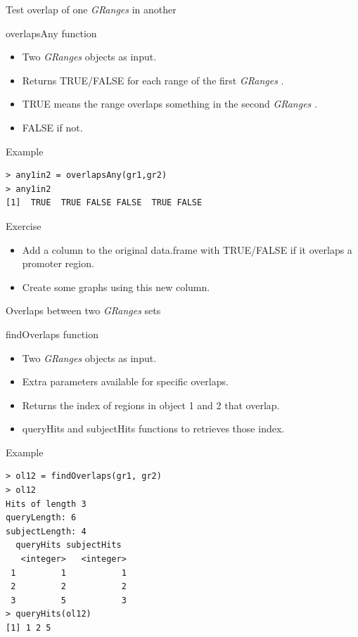 \documentclass[10pt]{beamer}
\newcommand{\gr}{{\it GRanges} }
\begin{document}
\begin{frame}[fragile, shrink=10]{Test overlap of one \gr in another}
  \begin{block}{{\sf overlapsAny} function}
    \begin{itemize}
    \item Two {\it GRanges} objects as input.
    \item Returns {\sf TRUE/FALSE} for each range of the first \gr.
    \item {\sf TRUE} means the range overlaps something in the second \gr.
    \item {\sf FALSE} if not.
    \end{itemize}
  \end{block}
  \begin{exampleblock}{Example}
\begin{verbatim}
> any1in2 = overlapsAny(gr1,gr2)
> any1in2
[1]  TRUE  TRUE FALSE FALSE  TRUE FALSE
\end{verbatim}
  \end{exampleblock}
  \begin{alertblock}{Exercise}
    \begin{itemize}
    \item Add a column to the original data.frame with {\sf TRUE/FALSE} if it overlaps a promoter region.
    \item Create some graphs using this new column.
    \end{itemize}
  \end{alertblock}
\end{frame}


\begin{frame}[fragile, shrink=10]{Overlaps between two {\it GRanges} sets}
  \begin{block}{{\sf findOverlaps} function}
    \begin{itemize}
    \item Two {\it GRanges} objects as input.
    \item Extra parameters available for specific overlaps.
    \item Returns the index of regions in object 1 and 2 that overlap.
    \item {\sf queryHits} and {\sf subjectHits} functions to retrieves those index.
    \end{itemize}
  \end{block}
  \begin{exampleblock}{Example}
\begin{verbatim}
> ol12 = findOverlaps(gr1, gr2)
> ol12
Hits of length 3
queryLength: 6
subjectLength: 4
  queryHits subjectHits 
   <integer>   <integer> 
 1         1           1 
 2         2           2 
 3         5           3 
> queryHits(ol12)
[1] 1 2 5
\end{verbatim}
  \end{exampleblock}
  
\end{frame}
\end{document}
